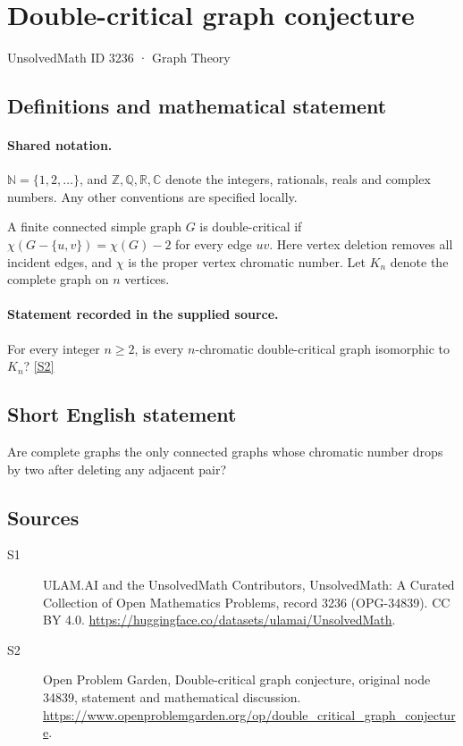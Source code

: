 \documentclass[11pt]{article}
\newcommand{\sref}[2]{\hyperlink{source:#1:#2}{[S#2]}}
\begin{document}
\setcounter{section}{3235}
\section{Double-critical graph conjecture}\label{3236}
{\small\sffamily UnsolvedMath ID 3236 · Graph Theory}
\subsection{Definitions and mathematical statement}

\paragraph{Shared notation.}$\mathbb N=\{1,2,\ldots\}$, and $\mathbb Z,\mathbb Q,\mathbb R,\mathbb C$ denote the integers, rationals, reals and complex numbers. Any other conventions are specified locally.


A finite connected simple graph $G$ is double-critical if $\chi(G-\{u,v\})=\chi(G)-2$ for every edge $uv$. Here vertex deletion removes all incident edges, and $\chi$ is the proper vertex chromatic number. Let $K_n$ denote the complete graph on $n$ vertices.
\paragraph{Statement recorded in the supplied source.}
For every integer $n\ge2$, is every $n$-chromatic double-critical graph isomorphic to $K_n$? \sref{3236}{2}
\subsection{Short English statement}
Are complete graphs the only connected graphs whose chromatic number drops by two after deleting any adjacent pair?
\subsection{Sources}
\begin{description}
\item[\hypertarget{source:3236:1}{S1}] ULAM.AI and the UnsolvedMath Contributors, UnsolvedMath: A Curated Collection of Open Mathematics Problems, record 3236 (OPG-34839). CC BY 4.0. \url{https://huggingface.co/datasets/ulamai/UnsolvedMath}.
\item[\hypertarget{source:3236:2}{S2}] Open Problem Garden, Double-critical graph conjecture, original node 34839, statement and mathematical discussion. \url{https://www.openproblemgarden.org/op/double_critical_graph_conjecture}.
\end{description}
\label{end:3236}
\end{document}
